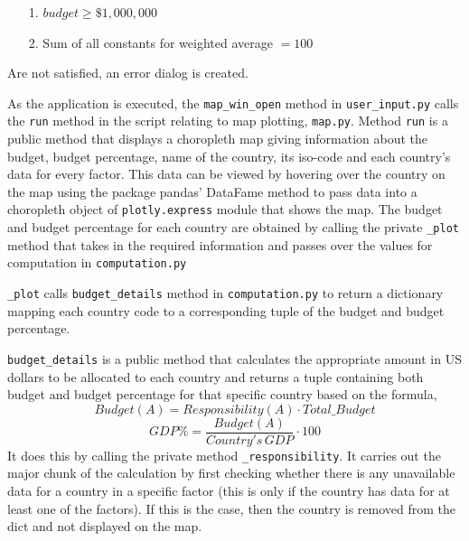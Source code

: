 \documentclass[fontsize=11pt]{article}
\begin{document}
    \begin{enumerate}
        \item [1.] $budget \geq \$1,000,000$
        \item [2.] Sum of all constants for weighted average $= 100$
    \end{enumerate}

	Are not satisfied, an error dialog is created.\newline

    As the application is executed, the \texttt{map\_win\_open} method in \texttt{user\_input.py} calls the \texttt{run}
    method in the script relating to map plotting, \texttt{map.py}. Method \texttt{run} is a public method that displays a choropleth map giving information about the
    budget, budget percentage, name of the country, its iso-code and each country’s data for every
    factor. This data can be viewed by hovering over the country on the map
    using the package pandas’ DataFame method to pass data into a choropleth object of \texttt{plotly.express} module that shows the map. The budget and budget percentage for each
    country are obtained by calling the private \texttt{\_plot} method that takes in the required information and passes over the values for computation in \texttt{computation.py} \newline
    
    \texttt{\_plot} calls \texttt{budget\_details} method in \texttt{computation.py} to return a dictionary mapping each country code to a
    corresponding tuple of the budget and budget percentage.\newline

    \texttt{budget\_details} is a public method that calculates the appropriate amount in US dollars to be allocated to
    each country and returns a tuple containing both budget and budget percentage for that specific country
    based on the formula,
    \[
        Budget(A) = Responsibility(A) \cdot Total \_ Budget
    \]
    \[
        GDP \% = \frac{Budget(A)}{Country's \, GDP} \cdot 100
    \]
    It does this by calling the private method \texttt{\_responsibility}. It carries out
    the major chunk of the calculation by first checking whether there is any unavailable data for a country in a
    specific factor (this is only if the country has data for at least one of the factors). If this is the
    case, then the country is removed from the dict and not displayed on the map. \newline
\end{document}
